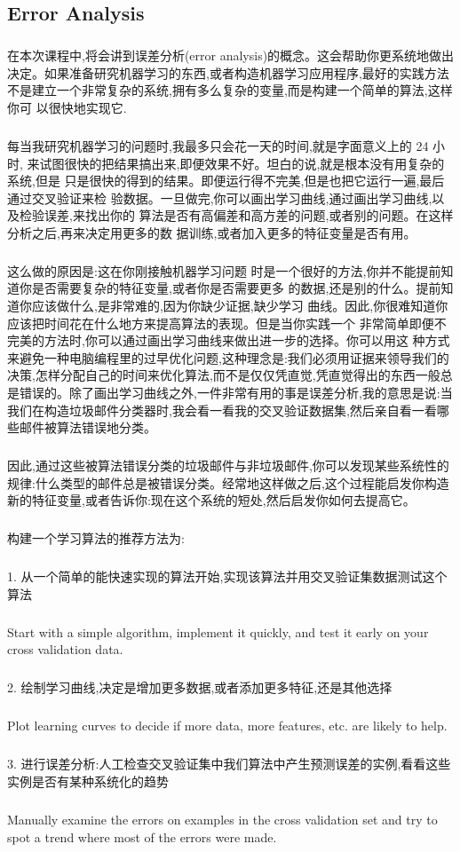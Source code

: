 \documentclass{article}
\begin{document}
\begin{CJK}{UTF8}{gbsn}
\subsection{Error Analysis}
\subparagraph{}
在本次课程中,将会讲到误差分析(error analysis)的概念。这会帮助你更系统地做出决定。如果准备研究机器学习的东西,或者构造机器学习应用程序,最好的实践方法
不是建立一个非常复杂的系统,拥有多么复杂的变量,而是构建一个简单的算法,这样你可
以很快地实现它.
\subparagraph{}
每当我研究机器学习的问题时,我最多只会花一天的时间,就是字面意义上的 24 小时,
来试图很快的把结果搞出来,即便效果不好。坦白的说,就是根本没有用复杂的系统,但是
只是很快的得到的结果。即便运行得不完美,但是也把它运行一遍,最后通过交叉验证来检
验数据。一旦做完,你可以画出学习曲线,通过画出学习曲线,以及检验误差,来找出你的
算法是否有高偏差和高方差的问题,或者别的问题。在这样分析之后,再来决定用更多的数
据训练,或者加入更多的特征变量是否有用。
\subparagraph{}
这么做的原因是:这在你刚接触机器学习问题
时是一个很好的方法,你并不能提前知道你是否需要复杂的特征变量,或者你是否需要更多
的数据,还是别的什么。提前知道你应该做什么,是非常难的,因为你缺少证据,缺少学习
曲线。因此,你很难知道你应该把时间花在什么地方来提高算法的表现。但是当你实践一个
非常简单即便不完美的方法时,你可以通过画出学习曲线来做出进一步的选择。你可以用这
种方式来避免一种电脑编程里的过早优化问题,这种理念是:我们必须用证据来领导我们的决策,怎样分配自己的时间来优化算法,而不是仅仅凭直觉,凭直觉得出的东西一般总是错误的。除了画出学习曲线之外,一件非常有用的事是误差分析,我的意思是说:当我们在构造垃圾邮件分类器时,我会看一看我的交叉验证数据集,然后亲自看一看哪些邮件被算法错误地分类。
\subparagraph{}
因此,通过这些被算法错误分类的垃圾邮件与非垃圾邮件,你可以发现某些系统性的规律:什么类型的邮件总是被错误分类。经常地这样做之后,这个过程能启发你构造新的特征变量,或者告诉你:现在这个系统的短处,然后启发你如何去提高它。
\begin{figure}[H]
\label{fig:674}
\end{figure}
\subparagraph{}
构建一个学习算法的推荐方法为:
\subparagraph{}
1. 从一个简单的能快速实现的算法开始,实现该算法并用交叉验证集数据测试这个算法
\subparagraph{}
Start with a simple algorithm, implement it quickly, and test it early on your cross validation data.
\subparagraph{}
2. 绘制学习曲线,决定是增加更多数据,或者添加更多特征,还是其他选择
\subparagraph{}
Plot learning curves to decide if more data, more features, etc. are likely to help.
\subparagraph{}
3. 进行误差分析:人工检查交叉验证集中我们算法中产生预测误差的实例,看看这些实例是否有某种系统化的趋势
\subparagraph{}
Manually examine the errors on examples in the cross validation set and try to spot a trend where most of the errors were made.

\end{CJK}
\end{document}
